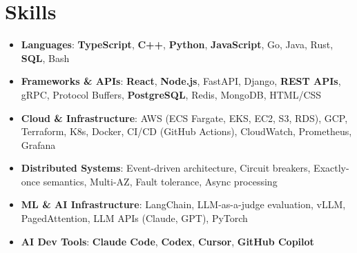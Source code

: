\documentclass[letterpaper,11pt]{article}
\newcommand{\resumeSubHeadingListStart}{\begin{itemize}[leftmargin=0.15in, label={}]}
\newcommand{\resumeSubHeadingListEnd}{\end{itemize}}
\newcommand{\resumeSkillHeading}[2]{%
  \item\small{\textbf{#1}: #2 \vspace{-9pt}}%
}
\begin{document}
\section{Skills}
  \resumeSubHeadingListStart
    \resumeSkillHeading{Languages}{\textbf{TypeScript}, \textbf{C++}, \textbf{Python}, \textbf{JavaScript}, Go, Java, Rust, \textbf{SQL}, Bash}
    \resumeSkillHeading{Frameworks \& APIs}{\textbf{React}, \textbf{Node.js}, FastAPI, Django, \textbf{REST APIs}, gRPC, Protocol Buffers, \textbf{PostgreSQL}, Redis, MongoDB, HTML/CSS}
    \resumeSkillHeading{Cloud \& Infrastructure}{AWS (ECS Fargate, EKS, EC2, S3, RDS), GCP, Terraform, K8s, Docker, CI/CD (GitHub Actions), CloudWatch, Prometheus, Grafana}
    \resumeSkillHeading{Distributed Systems}{Event-driven architecture, Circuit breakers, Exactly-once semantics, Multi-AZ, Fault tolerance, Async processing}
    \resumeSkillHeading{ML \& AI Infrastructure}{LangChain, LLM-as-a-judge evaluation, vLLM, PagedAttention, LLM APIs (Claude, GPT), PyTorch}
    \resumeSkillHeading{AI Dev Tools}{\textbf{Claude Code}, \textbf{Codex}, \textbf{Cursor}, \textbf{GitHub Copilot}}
  \resumeSubHeadingListEnd
\end{document}
